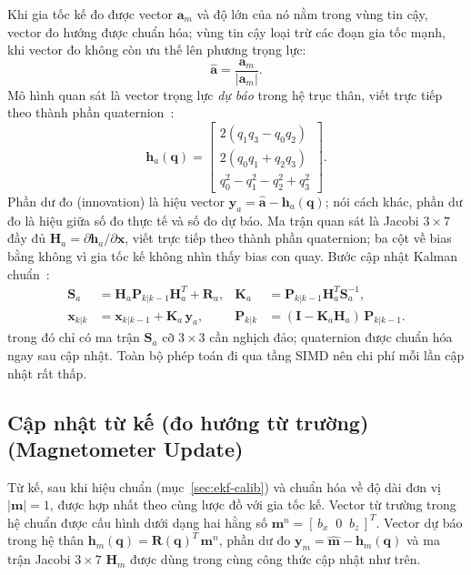 Khi gia tốc kế đo được vector $\mathbf{a}_m$ và độ lớn của nó nằm trong vùng tin cậy, vector đo hướng được chuẩn hóa; vùng tin cậy loại trừ các đoạn gia tốc mạnh, khi vector đo không còn ưu thế lên phương trọng lực:
\begin{equation}
\hat{\mathbf{a}} = \frac{\mathbf{a}_m}{|\mathbf{a}_m|}.
\end{equation}
Mô hình quan sát là vector trọng lực \textit{dự báo} trong hệ trục thân, viết trực tiếp theo thành phần quaternion~\cite{sabatini2011}:
\begin{equation}
\mathbf{h}_a(\mathbf{q}) =
\begin{bmatrix}
2(q_1 q_3 - q_0 q_2) \\
2(q_0 q_1 + q_2 q_3) \\
q_0^{2} - q_1^{2} - q_2^{2} + q_3^{2}
\end{bmatrix}.
\end{equation}
Phần dư đo (innovation) là hiệu vector $\mathbf{y}_a = \hat{\mathbf{a}} - \mathbf{h}_a(\mathbf{q})$; nói cách khác, phần dư đo là hiệu giữa số đo thực tế và số đo dự báo. Ma trận quan sát là Jacobi $3\times 7$ đầy đủ $\mathbf{H}_a = \partial \mathbf{h}_a / \partial \mathbf{x}$, viết trực tiếp theo thành phần quaternion; ba cột về bias bằng không vì gia tốc kế không nhìn thấy bias con quay. Bước cập nhật Kalman chuẩn~\cite{kalman1960}:
\begin{equation}
\begin{aligned}
\mathbf{S}_a &= \mathbf{H}_a \mathbf{P}_{k|k-1} \mathbf{H}_a^{T} + \mathbf{R}_a, &
\mathbf{K}_a &= \mathbf{P}_{k|k-1} \mathbf{H}_a^{T} \mathbf{S}_a^{-1}, \\
\mathbf{x}_{k|k} &= \mathbf{x}_{k|k-1} + \mathbf{K}_a\, \mathbf{y}_a, &
\mathbf{P}_{k|k} &= (\mathbf{I} - \mathbf{K}_a \mathbf{H}_a)\,\mathbf{P}_{k|k-1}.
\end{aligned}
\end{equation}
trong đó chỉ có ma trận $\mathbf{S}_a$ cỡ $3\times 3$ cần nghịch đảo; quaternion được chuẩn hóa ngay sau cập nhật. Toàn bộ phép toán đi qua tầng SIMD nên chi phí mỗi lần cập nhật rất thấp.

\subsection{Cập nhật từ kế (đo hướng từ trường) (Magnetometer Update)}

Từ kế, sau khi hiệu chuẩn (mục~\ref{sec:ekf-calib}) và chuẩn hóa về độ dài đơn vị $|\mathbf{m}| = 1$, được hợp nhất theo cùng lược đồ với gia tốc kế. Vector từ trường trong hệ chuẩn được cấu hình dưới dạng hai hằng số $\mathbf{m}^{n} = \left[\,b_x \;\; 0 \;\; b_z\,\right]^{T}$. Vector dự báo trong hệ thân $\mathbf{h}_m(\mathbf{q}) = \mathbf{R}(\mathbf{q})^{T}\,\mathbf{m}^{n}$, phần dư đo $\mathbf{y}_m = \hat{\mathbf{m}} - \mathbf{h}_m(\mathbf{q})$ và ma trận Jacobi $3\times 7$ $\mathbf{H}_m$ được dùng trong cùng công thức cập nhật như trên.

